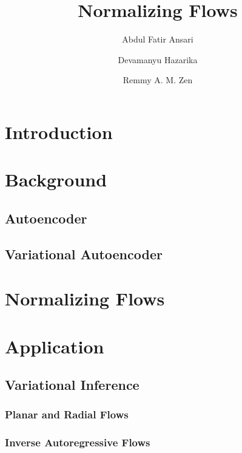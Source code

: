 \documentclass[runningheads]{llncs}
\begin{document}
%
\title{Normalizing Flows}
%
%
\author{Abdul Fatir Ansari \and
Devamanyu Hazarika \and
Remmy A. M. Zen}
%
%
%
\maketitle              %
%
\begin{abstract}


\end{abstract}
%
%
%
\section{Introduction}
\section{Background}
\subsection{Autoencoder}
\subsection{Variational Autoencoder}


\section{Normalizing Flows}


\section{Application}
\subsection{Variational Inference}
\subsubsection{Planar and Radial Flows}
\subsubsection{Inverse Autoregressive Flows}
~\cite{kingma2016improved}
\end{document}
